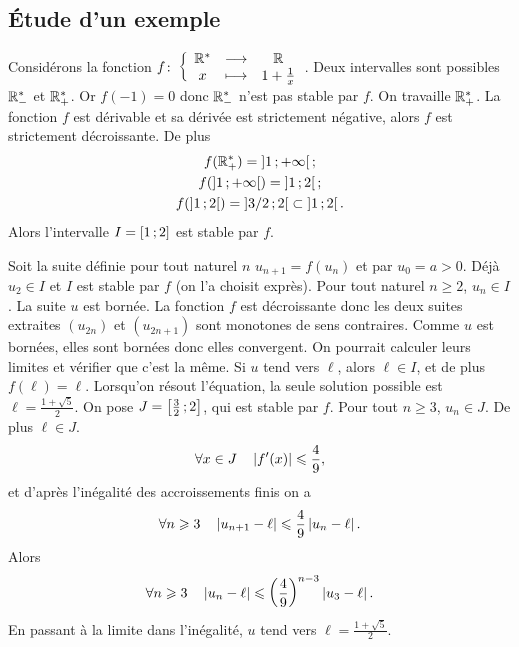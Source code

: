 \subsection{Étude d'un exemple}

Considérons la fonction \(f\colon \left\{\begin{array}{ccc} \mathbb{R}^{*} & \longrightarrow &\mathbb{R}\\ x & \longmapsto & 1+\frac{1}{x} \end{array} \right.\). Deux 
intervalles sont possibles \(\mathbb{R}_{-}^{*}\) et \(\mathbb{R}_{+}^{*}\). Or \(f(-1)=0\) 
donc \(\mathbb{R}_{-}^{*}\) n'est pas stable par \(f\). On travaille 
\(\mathbb{R}_{+}^{*}\). La fonction \(f\) est dérivable et sa dérivée est strictement 
négative, alors \(f\) est strictement décroissante. De plus
\begin{gather}
  f(\mathbb{R}_{+}^{*})=\left] 1 \, ;  +\infty \right[; \\
  f(\left] 1 \, ;  +\infty \right[)=\left] 1 \, ;  2 \right[;\\
  f(\left] 1 \, ;  2 \right[)=\left] 3/2 \, ;  2 \right[ \subset \left] 1 \, ;  2 \right[.
\end{gather}
Alors l'intervalle \(I=\left[ 1 \, ;  2 \right]\) est stable par \(f\).

Soit la suite définie pour tout naturel \(n\) \(u_{n+1}=f(u_n)\) et par \(u_0 = 
a>0\). Déjà \(u_2 \in I\) et \(I\) est stable par \(f\) (on l'a choisit exprès). 
Pour tout naturel \(n \geqslant 2\), \(u_n \in I\). La suite \(u\) est bornée. 
La fonction \(f\) est décroissante donc les deux suites extraites \((u_{2n})\) 
et \((u_{2n+1})\) sont monotones de sens contraires. Comme \(u\) est bornées, 
elles sont bornées donc elles convergent. On pourrait calculer leurs limites et 
vérifier que c'est la même. Si \(u\) tend vers \(\ell\), alors \(\ell \in I\), 
et de plus \(f(\ell)=\ell\). Lorsqu'on résout l'équation, la seule solution 
possible est \(\ell=\frac{1+\sqrt{5}}{2}\). On pose 
\(J=\left[ \frac{3}{2} \, ;  2 \right]\), qui est stable par \(f\). Pour tout \(n 
\geqslant 3\), \(u_n \in J\). De plus \(\ell \in J\).
\begin{equation}
  \forall x \in J \quad \left\lvert f'(x)\right\rvert\leqslant \frac{4}{9},
\end{equation}
et d'après l'inégalité des accroissements finis on a
\begin{equation}
  \forall n \geqslant 3 \quad \left\lvert u_{n+1}-\ell\right\rvert  \leqslant \frac{4}{9} 
  \left\lvert u_n-\ell\right\rvert.
\end{equation}
Alors
\begin{equation}
  \forall n \geqslant 3 \quad \left\lvert u_n-\ell\right\rvert \leqslant 
  \left(\frac{4}{9}\right)^{n-3}\left\lvert u_3-\ell\right\rvert.
\end{equation}
En passant à la limite dans l'inégalité, \(u\) tend vers 
\(\ell=\frac{1+\sqrt{5}}{2}\).

